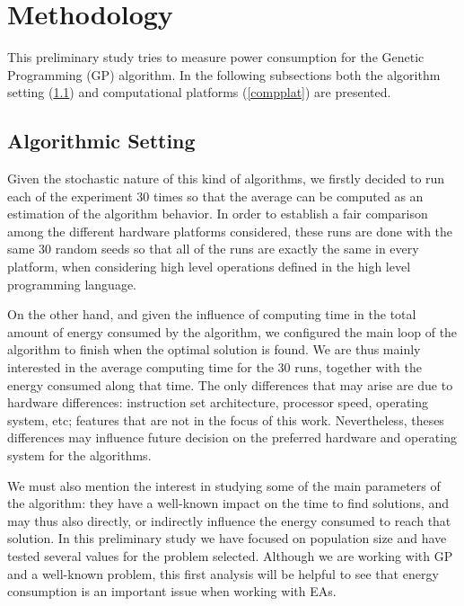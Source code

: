 \section{Methodology}
\label{methodology}

This preliminary study tries to measure power consumption for 
the Genetic Programming (GP) algorithm. In the following subsections both the algorithm setting (\ref{algsetting}) and computational platforms (\ref{compplat}) are presented.

\subsection{Algorithmic Setting}
\label{algsetting}

Given the stochastic nature of this kind of algorithms, we firstly decided to run each of the experiment 30 times so that the average can be computed as an estimation of the algorithm behavior. In order to establish a fair comparison among the different hardware platforms considered, these runs are done with the same 30 random seeds so that all of the runs are exactly the same in every platform, when considering high level operations defined in the high level programming language.

On the other hand, and given the influence of computing time in the total amount of energy consumed by the algorithm, we configured the main loop of the algorithm to finish when 
the optimal solution is found.  We are thus mainly interested in the average computing time for the 30 runs, together with the energy consumed along that time.  The only differences that may arise are due to hardware differences:  instruction set architecture, processor speed, operating system, etc;  %
features that are not in the focus of this work.  Nevertheless, theses differences may influence future decision on the preferred hardware and operating system for the algorithms.  

We must also mention the interest in studying some of the main parameters of the algorithm:  they have a well-known impact on the time to find solutions, and may thus also directly, or indirectly influence the energy consumed to reach that solution.  In this preliminary study we have focused on population size and have tested several values for the problem selected.  Although we are working with GP and a well-known problem, this first analysis will be helpful to see that energy consumption is an important issue when working with EAs.

